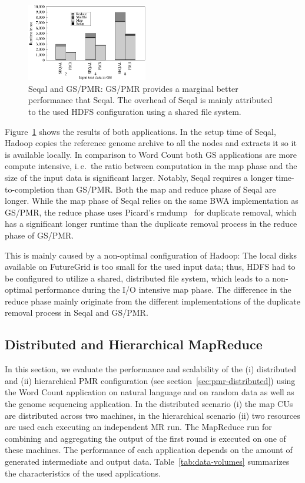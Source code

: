 \documentclass[12pt]{report}
\newcommand{\upp}{\vspace*{-0.5em}}
\begin{document}
\begin{figure}[ht]
	\centering
		\includegraphics[width=0.47\textwidth]{figures/gs_seq_pmr.pdf}
\caption{Seqal and GS/PMR: GS/PMR provides a marginal better performance that 
Seqal. The overhead of Seqal is mainly attributed to the used HDFS configuration 
using a shared file system.\upp} 	
\label{fig:gs_seq_pmr}
\end{figure}		

Figure~\ref{fig:gs_seq_pmr} shows the results of both applications. In the setup
time of Seqal, Hadoop copies the reference genome archive to all the nodes and
extracts it so it is available locally. In comparison to Word Count both GS
applications are more compute intensive, i.\,e.\ the ratio between computation
in the map phase and the size of the input data is significant larger. Notably,
Seqal requires a longer time-to-completion than GS/PMR. Both the map and reduce
phase of Seqal are longer. While the map phase of Seqal relies on the same BWA
implementation as GS/PMR, the reduce phase uses Picard's rmdump~\cite{picard}
for duplicate removal, which has a significant longer runtime than the duplicate
removal process in the reduce phase of GS/PMR.

This is mainly caused by a non-optimal configuration of Hadoop: The local disks
available on FutureGrid is too small for the used input data; thus, HDFS had
to be configured to utilize a shared, distributed file system, which
leads to a non-optimal performance during the I/O intensive map
phase. The difference in the reduce phase mainly originate from the
different implementations of the duplicate removal process in Seqal
and GS/PMR.

\upp\upp
\subsection{Distributed and Hierarchical MapReduce}

In this section, we evaluate the performance and scalability of the
(i) distributed and (ii) hierarchical PMR configuration (see
section~\ref{sec:pmr-distributed}) using the Word Count application on
natural language and on random data as well as the genome sequencing
application. In the distributed scenario (i) the map CUs are
distributed across two machines, in the hierarchical scenario (ii) two
resources are used each executing an independent MR run. The MapReduce
run for combining and aggregating the output of the first round is
executed on one of these machines. The performance of each application
depends on the amount of generated intermediate and output
data.  Table~\ref{tab:data-volumes} summarizes the characteristics of
the used applications.
\end{document}

